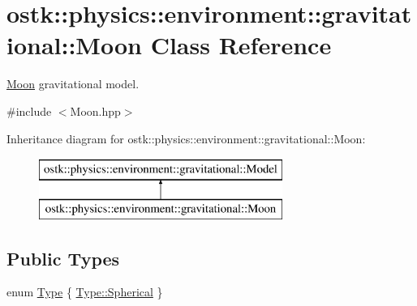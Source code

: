 \hypertarget{classostk_1_1physics_1_1environment_1_1gravitational_1_1_moon}{}\section{ostk\+:\+:physics\+:\+:environment\+:\+:gravitational\+:\+:Moon Class Reference}
\label{classostk_1_1physics_1_1environment_1_1gravitational_1_1_moon}


\hyperlink{classostk_1_1physics_1_1environment_1_1gravitational_1_1_moon}{Moon} gravitational model.  




{\ttfamily \#include $<$Moon.\+hpp$>$}

Inheritance diagram for ostk\+:\+:physics\+:\+:environment\+:\+:gravitational\+:\+:Moon\+:\begin{figure}[H]
\begin{center}
\leavevmode
\includegraphics[height=2.000000cm]{classostk_1_1physics_1_1environment_1_1gravitational_1_1_moon}
\end{center}
\end{figure}
\subsection*{Public Types}
\begin{DoxyCompactItemize}
\item 
enum \hyperlink{classostk_1_1physics_1_1environment_1_1gravitational_1_1_moon_a09ec881799f85fdef3547ef443d57c27}{Type} \{ \hyperlink{classostk_1_1physics_1_1environment_1_1gravitational_1_1_moon_a09ec881799f85fdef3547ef443d57c27a24e5c24fabd1c081d4c729094df0b947}{Type\+::\+Spherical}
 \}
\end{DoxyCompactItemize}
